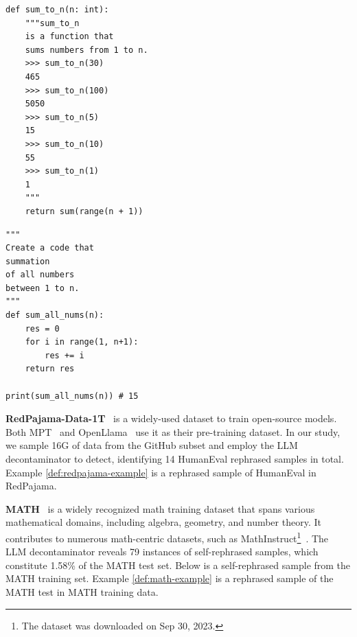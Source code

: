 \begin{example}[CodeAlpaca]\label{def:codealpaca-example}

\begin{tcolorbox}[title={HumanEval test}, enhanced, colback=white, boxrule=1pt, sharp corners, boxsep=5pt, left=5pt, right=5pt, top=5pt, bottom=5pt]
\fontsize{8pt}{8pt}\selectfont
\begin{verbatim}
def sum_to_n(n: int):
    """sum_to_n 
    is a function that 
    sums numbers from 1 to n.
    >>> sum_to_n(30)
    465
    >>> sum_to_n(100)
    5050
    >>> sum_to_n(5)
    15
    >>> sum_to_n(10)
    55
    >>> sum_to_n(1)
    1
    """
    return sum(range(n + 1))
\end{verbatim}
\end{tcolorbox}


\begin{tcolorbox}[title={CodeAlpaca}, enhanced, colback=white, boxrule=1pt, sharp corners, boxsep=5pt, left=5pt, right=5pt, top=5pt, bottom=5pt]
\fontsize{8pt}{8pt}\selectfont
\begin{verbatim}
"""
Create a code that 
summation 
of all numbers 
between 1 to n.
"""
def sum_all_nums(n):
    res = 0
    for i in range(1, n+1):
        res += i
    return res

print(sum_all_nums(n)) # 15
\end{verbatim}
\end{tcolorbox}
\end{example}

\textbf{RedPajama-Data-1T}~\citep{together2023redpajama} is a widely-used dataset to train open-source models. 
Both MPT~\citep{MosaicML2023Introducing} and OpenLlama~\citep{openlm2023openllama} use it as their pre-training dataset. 
In our study, we sample 16G of data from the GitHub subset and employ the LLM decontaminator to detect, identifying 14 HumanEval rephrased samples in total.
Example \ref{def:redpajama-example} is a rephrased sample of HumanEval in RedPajama.

\textbf{MATH}~\citep{hendrycksmath2021} is a widely recognized math training dataset that spans various mathematical domains, including algebra, geometry, and number theory. It contributes to numerous math-centric datasets, such as MathInstruct\footnote{The dataset was downloaded on Sep 30, 2023.}~\citep{yue2023mammoth}. 
The LLM decontaminator reveals 79 instances of self-rephrased samples, which constitute 1.58\% of the MATH test set. Below is a self-rephrased sample from the MATH training set. 
Example \ref{def:math-example} is a rephrased sample of the MATH test in MATH training data.

